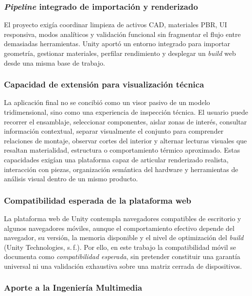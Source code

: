 \subsubsection{\textit{Pipeline} integrado de importación y renderizado}

El proyecto exigía coordinar limpieza de activos CAD, materiales PBR, UI responsiva, modos analíticos y validación funcional sin fragmentar el flujo entre demasiadas herramientas. Unity aportó un entorno integrado para importar geometría, gestionar materiales, perfilar rendimiento y desplegar un \textit{build} web desde una misma base de trabajo.

\subsubsection{Capacidad de extensión para visualización técnica}

La aplicación final no se concibió como un visor pasivo de un modelo tridimensional, sino como una experiencia de inspección técnica. El usuario puede recorrer el ensamblaje, seleccionar componentes, aislar zonas de interés, consultar información contextual, separar visualmente el conjunto para comprender relaciones de montaje, observar cortes del interior y alternar lecturas visuales que resaltan materialidad, estructura o comportamiento térmico aproximado. Estas capacidades exigían una plataforma capaz de articular renderizado realista, interacción con piezas, organización semántica del hardware y herramientas de análisis visual dentro de un mismo producto.

\subsubsection{Compatibilidad esperada de la plataforma web}

La plataforma web de Unity contempla navegadores compatibles de escritorio y algunos navegadores móviles, aunque el comportamiento efectivo depende del navegador, su versión, la memoria disponible y el nivel de optimización del \textit{build} (Unity Technologies, s.\,f.). Por ello, en este trabajo la compatibilidad móvil se documenta como \textit{compatibilidad esperada}, sin pretender constituir una garantía universal ni una validación exhaustiva sobre una matriz cerrada de dispositivos.

\subsubsection{Aporte a la Ingeniería Multimedia}

